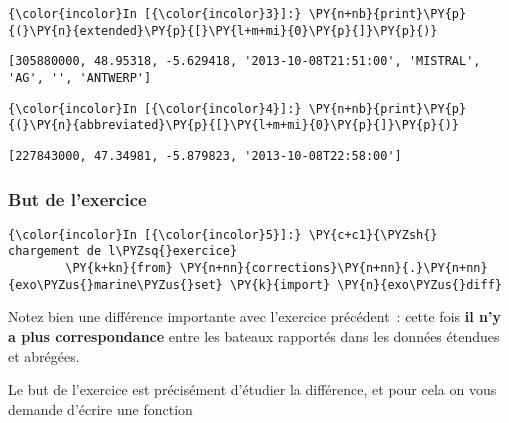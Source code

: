     \begin{Verbatim}[commandchars=\\\{\}]
{\color{incolor}In [{\color{incolor}3}]:} \PY{n+nb}{print}\PY{p}{(}\PY{n}{extended}\PY{p}{[}\PY{l+m+mi}{0}\PY{p}{]}\PY{p}{)}
\end{Verbatim}


    \begin{Verbatim}[commandchars=\\\{\}]
[305880000, 48.95318, -5.629418, '2013-10-08T21:51:00', 'MISTRAL', 'AG', '', 'ANTWERP']

    \end{Verbatim}

    \begin{Verbatim}[commandchars=\\\{\}]
{\color{incolor}In [{\color{incolor}4}]:} \PY{n+nb}{print}\PY{p}{(}\PY{n}{abbreviated}\PY{p}{[}\PY{l+m+mi}{0}\PY{p}{]}\PY{p}{)}
\end{Verbatim}


    \begin{Verbatim}[commandchars=\\\{\}]
[227843000, 47.34981, -5.879823, '2013-10-08T22:58:00']

    \end{Verbatim}

    \hypertarget{but-de-lexercice}{%
\subsubsection{But de l'exercice}\label{but-de-lexercice}}

    \begin{Verbatim}[commandchars=\\\{\}]
{\color{incolor}In [{\color{incolor}5}]:} \PY{c+c1}{\PYZsh{} chargement de l\PYZsq{}exercice}
        \PY{k+kn}{from} \PY{n+nn}{corrections}\PY{n+nn}{.}\PY{n+nn}{exo\PYZus{}marine\PYZus{}set} \PY{k}{import} \PY{n}{exo\PYZus{}diff}
\end{Verbatim}


    Notez bien une différence importante avec l'exercice précédent~: cette
fois \textbf{il n'y a plus correspondance} entre les bateaux rapportés
dans les données étendues et abrégées.

Le but de l'exercice est précisément d'étudier la différence, et pour
cela on vous demande d'écrire une fonction

\begin{Shaded}
\begin{Highlighting}[]
\end{Highlighting}
\end{Shaded}

